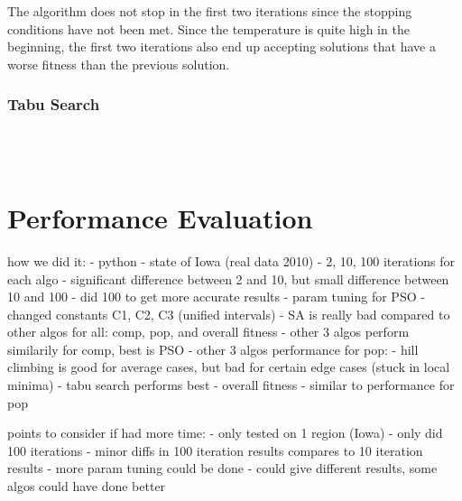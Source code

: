 \documentclass[journal]{IEEEtran}
\begin{document}
The algorithm does not stop in the first two iterations since the stopping conditions have not been met. Since the temperature is quite high in the beginning, the first two iterations also end up accepting solutions that have a worse fitness than the previous solution. \\

\subsubsection{Tabu Search}~\\\\


\section{Performance Evaluation}
how we did it: 
    - python
    - state of Iowa (real data 2010)
    - 2, 10, 100 iterations for each algo 
        - significant difference between 2 and 10, but small difference between 10 and 100 
        - did 100 to get more accurate results 
    - param tuning for PSO 
        - changed constants C1, C2, C3 (unified intervals) 
- SA is really bad compared to other algos for all: comp, pop, and overall fitness 
- other 3 algos perform similarily for comp, best is PSO 
- other 3 algos performance for pop: 
    - hill climbing is good for average cases, but bad for certain edge cases (stuck in local minima)
    - tabu search performs best 
- overall fitness 
    - similar to performance for pop 

points to consider if had more time:
- only tested on 1 region (Iowa) 
- only did 100 iterations 
    - minor diffs in 100 iteration results compares to 10 iteration results 
- more param tuning could be done 
    - could give different results, some algos could have done better 
\end{document}
